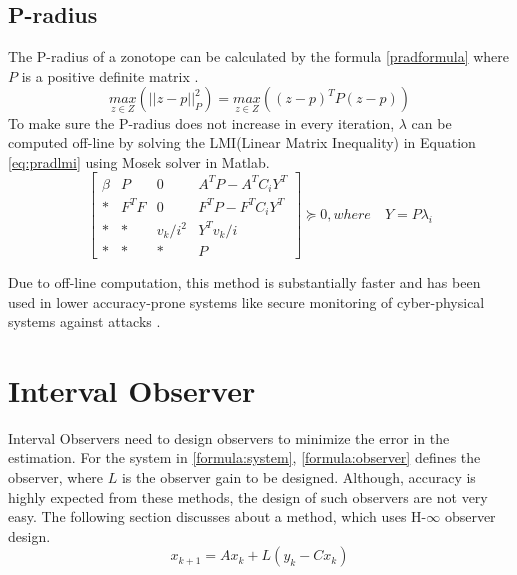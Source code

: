 \subsection{P-radius}
The P-radius of a zonotope can be calculated by the formula \eqref{pradformula} where $P$ is a positive definite matrix \cite{Alamo2005}.
\begin{equation}
\label{pradformula}
\underset{z \in Z}{max} (||z - p||^2_{P}) = \underset{z \in Z}{max}((z-p)^T P (z-p))
\end{equation}
To make sure the P-radius does not increase in every iteration, $\lambda$ can be computed off-line by solving the LMI(Linear Matrix Inequality) in Equation \eqref{eq:pradlmi} using Mosek solver in Matlab.
\begin{equation}
\label{eq:pradlmi}
\left[
\begin{matrix}
\beta & P & 0 & A^TP - A^TC_iY^T\\
* & F^TF & 0 & F^TP -F^TC_iY^T\\
* & * & v_k/i ^2 & Y^Tv_k/i\\
* & * & * & P
\end{matrix}\right] \succeq 0,
where\quad Y = P\lambda_i
\end{equation}

Due to off-line computation, this method is substantially faster and has been used in lower accuracy-prone systems like secure monitoring of cyber-physical systems against attacks \cite{GE20201592}.

\section{Interval Observer}
Interval Observers need to design observers to minimize the error in the estimation. For the system in \eqref{formula:system}, \eqref{formula:observer} defines the observer, where $L$ is the observer gain to be designed. Although, accuracy is highly expected from these methods, the design of such observers are not very easy. The following section discusses about a method, which uses H-$\infty$ observer design.
\begin{equation}
\label{formula:observer}
x_{k+1} = Ax_k + L(y_k -Cx_k)
\end{equation}

